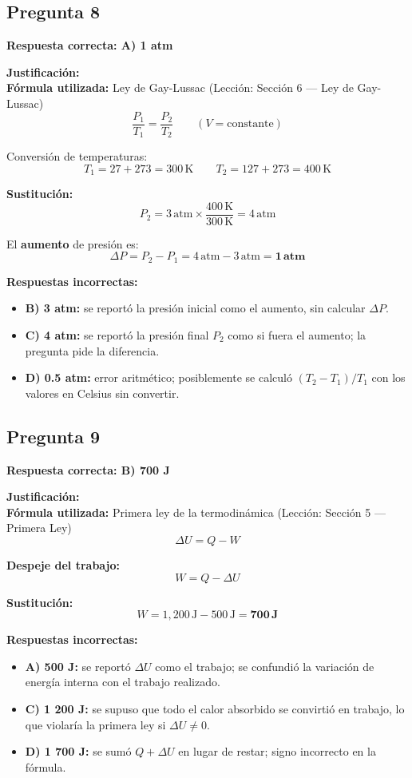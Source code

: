 \begin{respuestabox}
\subsection{Pregunta 8}
\textcolor{verdecorrecto}{\textbf{Respuesta correcta: A) 1 atm}}

\textbf{Justificación:}\\
\textbf{Fórmula utilizada:} Ley de Gay-Lussac (Lección: Sección 6 --- Ley de Gay-Lussac)
$$\frac{P_1}{T_1} = \frac{P_2}{T_2} \qquad (V = \text{constante})$$

Conversión de temperaturas:
$$T_1 = 27 + 273 = 300\,\text{K} \qquad T_2 = 127 + 273 = 400\,\text{K}$$

\textbf{Sustitución:}
$$P_2 = 3\,\text{atm} \times \frac{400\,\text{K}}{300\,\text{K}} = 4\,\text{atm}$$

El \textbf{aumento} de presión es:
$$\Delta P = P_2 - P_1 = 4\,\text{atm} - 3\,\text{atm} = \mathbf{1\,\text{atm}}$$

\textbf{Respuestas incorrectas:}
\begin{itemize}
    \item \textbf{B) 3 atm:} se reportó la presión inicial como el aumento, sin calcular $\Delta P$.
    \item \textbf{C) 4 atm:} se reportó la presión final $P_2$ como si fuera el aumento; la pregunta pide la diferencia.
    \item \textbf{D) 0.5 atm:} error aritmético; posiblemente se calculó $(T_2 - T_1)/T_1$ con los valores en Celsius sin convertir.
\end{itemize}
\end{respuestabox}

\begin{respuestabox}
\subsection{Pregunta 9}
\textcolor{verdecorrecto}{\textbf{Respuesta correcta: B) 700 J}}

\textbf{Justificación:}\\
\textbf{Fórmula utilizada:} Primera ley de la termodinámica (Lección: Sección 5 --- Primera Ley)
$$\Delta U = Q - W$$

\textbf{Despeje del trabajo:}
$$W = Q - \Delta U$$

\textbf{Sustitución:}
$$W = 1{,}200\,\text{J} - 500\,\text{J} = \mathbf{700\,\text{J}}$$

\textbf{Respuestas incorrectas:}
\begin{itemize}
    \item \textbf{A) 500 J:} se reportó $\Delta U$ como el trabajo; se confundió la variación de energía interna con el trabajo realizado.
    \item \textbf{C) 1 200 J:} se supuso que todo el calor absorbido se convirtió en trabajo, lo que violaría la primera ley si $\Delta U \neq 0$.
    \item \textbf{D) 1 700 J:} se sumó $Q + \Delta U$ en lugar de restar; signo incorrecto en la fórmula.
\end{itemize}
\end{respuestabox}

